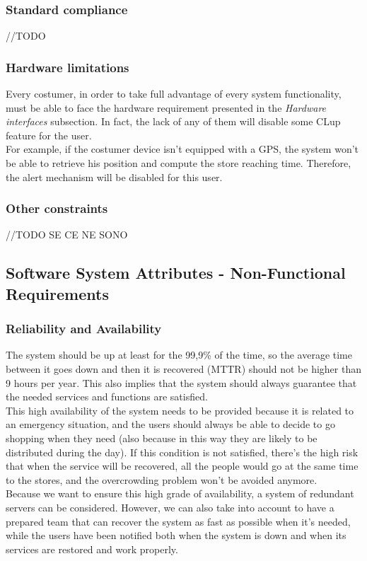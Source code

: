 \documentclass[]{article}
\begin{document}
		\subsubsection{Standard compliance}
		//TODO
		
		\subsubsection{Hardware limitations}
		Every costumer, in order to take full advantage of every system functionality, must be able to face the hardware requirement presented in the \textit{Hardware interfaces} subsection. In fact, the lack of any of them will disable some CLup feature for the user. \\
		For example, if the costumer device isn't equipped with a GPS, the system won't be able to retrieve his position and compute the store reaching time. Therefore, the alert mechanism will be disabled for this user.
		
		\subsubsection{Other constraints}
		//TODO SE CE NE SONO
			

		 
		\subsection{Software System Attributes - Non-Functional Requirements}
			\subsubsection{Reliability and Availability}
			
			The  system should be up at least for the 99,9\% of the time, so the average time between it goes down and then it is recovered (MTTR) should not be higher than 9 hours per year. This also implies that the system should always guarantee that the needed services and functions are satisfied.\\
This high availability of the system needs to be provided because it is related to an emergency situation, and the users should always be able to decide to go shopping when they need (also because in this way they are likely to be distributed during the day). If this condition is not satisfied, there’s the high risk that when the service will be recovered,  all the people would go at the same time to the stores, and the overcrowding problem won’t be avoided anymore.\\
Because we want to ensure this high grade of availability, a system of redundant servers can be considered. However, we can also take into account to have a prepared team that can recover the system as fast as possible when it’s needed, while the users have been notified both when the system is down and when its services are restored and work properly.\\
\end{document}
